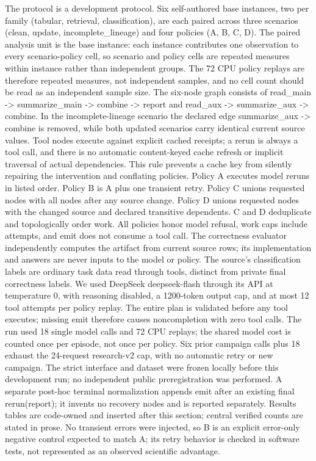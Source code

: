 \documentclass{article}
\begin{document}
The protocol is a development protocol. Six self-authored base instances, two per family (tabular, retrieval, classification), are each paired across three scenarios (clean, update, incomplete\_lineage) and four policies (A, B, C, D). The paired analysis unit is the base instance: each instance contributes one observation to every scenario-policy cell, so scenario and policy cells are repeated measures within instance rather than independent groups. The 72 CPU policy replays are therefore repeated measures, not independent samples, and no cell count should be read as an independent sample size. The six-node graph consists of read\_main -> summarize\_main -> combine -> report and read\_aux -> summarize\_aux -> combine. In the incomplete-lineage scenario the declared edge summarize\_aux -> combine is removed, while both updated scenarios carry identical current source values. Tool nodes execute against explicit cached receipts; a rerun is always a tool call, and there is no automatic content-keyed cache refresh or implicit traversal of actual dependencies. This rule prevents a cache key from silently repairing the intervention and conflating policies. Policy A executes model reruns in listed order. Policy B is A plus one transient retry. Policy C unions requested nodes with all nodes after any source change. Policy D unions requested nodes with the changed source and declared transitive dependents. C and D deduplicate and topologically order work. All policies honor model refusal, work caps include attempts, and emit does not consume a tool call. The correctness evaluator independently computes the artifact from current source rows; its implementation and answers are never inputs to the model or policy. The source's classification labels are ordinary task data read through tools, distinct from private final correctness labels. We used DeepSeek deepseek-flash through its API at temperature 0, with reasoning disabled, a 1200-token output cap, and at most 12 tool attempts per policy replay. The entire plan is validated before any tool executes; missing emit therefore causes noncompletion with zero tool calls. The run used 18 single model calls and 72 CPU replays; the shared model cost is counted once per episode, not once per policy. Six prior campaign calls plus 18 exhaust the 24-request research-v2 cap, with no automatic retry or new campaign. The strict interface and dataset were frozen locally before this development run; no independent public preregistration was performed. A separate post-hoc terminal normalization appends emit after an existing final rerun(report); it invents no recovery nodes and is reported separately. Results tables are code-owned and inserted after this section; central verified counts are stated in prose. No transient errors were injected, so B is an explicit error-only negative control expected to match A; its retry behavior is checked in software tests, not represented as an observed scientific advantage.
\end{document}
